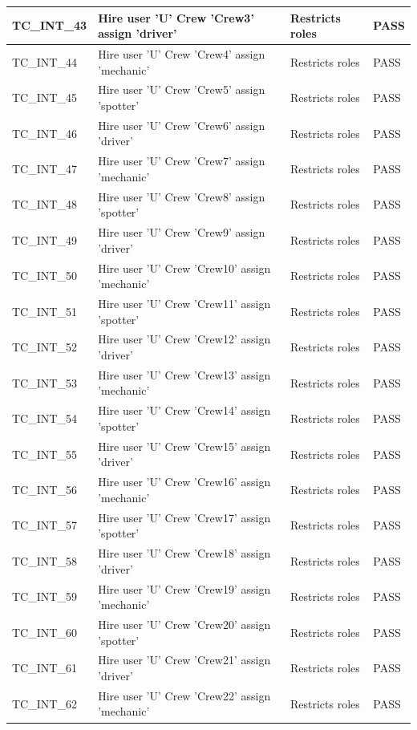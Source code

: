 \documentclass{article}
\begin{document}
\begin{longtable}{|p{2cm}|p{8cm}|p{3cm}|p{2cm}|}
\hline
TC\_INT\_43 & Hire user 'U' Crew 'Crew3' assign 'driver' & Restricts roles & PASS \\
\hline
TC\_INT\_44 & Hire user 'U' Crew 'Crew4' assign 'mechanic' & Restricts roles & PASS \\
\hline
TC\_INT\_45 & Hire user 'U' Crew 'Crew5' assign 'spotter' & Restricts roles & PASS \\
\hline
TC\_INT\_46 & Hire user 'U' Crew 'Crew6' assign 'driver' & Restricts roles & PASS \\
\hline
TC\_INT\_47 & Hire user 'U' Crew 'Crew7' assign 'mechanic' & Restricts roles & PASS \\
\hline
TC\_INT\_48 & Hire user 'U' Crew 'Crew8' assign 'spotter' & Restricts roles & PASS \\
\hline
TC\_INT\_49 & Hire user 'U' Crew 'Crew9' assign 'driver' & Restricts roles & PASS \\
\hline
TC\_INT\_50 & Hire user 'U' Crew 'Crew10' assign 'mechanic' & Restricts roles & PASS \\
\hline
TC\_INT\_51 & Hire user 'U' Crew 'Crew11' assign 'spotter' & Restricts roles & PASS \\
\hline
TC\_INT\_52 & Hire user 'U' Crew 'Crew12' assign 'driver' & Restricts roles & PASS \\
\hline
TC\_INT\_53 & Hire user 'U' Crew 'Crew13' assign 'mechanic' & Restricts roles & PASS \\
\hline
TC\_INT\_54 & Hire user 'U' Crew 'Crew14' assign 'spotter' & Restricts roles & PASS \\
\hline
TC\_INT\_55 & Hire user 'U' Crew 'Crew15' assign 'driver' & Restricts roles & PASS \\
\hline
TC\_INT\_56 & Hire user 'U' Crew 'Crew16' assign 'mechanic' & Restricts roles & PASS \\
\hline
TC\_INT\_57 & Hire user 'U' Crew 'Crew17' assign 'spotter' & Restricts roles & PASS \\
\hline
TC\_INT\_58 & Hire user 'U' Crew 'Crew18' assign 'driver' & Restricts roles & PASS \\
\hline
TC\_INT\_59 & Hire user 'U' Crew 'Crew19' assign 'mechanic' & Restricts roles & PASS \\
\hline
TC\_INT\_60 & Hire user 'U' Crew 'Crew20' assign 'spotter' & Restricts roles & PASS \\
\hline
TC\_INT\_61 & Hire user 'U' Crew 'Crew21' assign 'driver' & Restricts roles & PASS \\
\hline
TC\_INT\_62 & Hire user 'U' Crew 'Crew22' assign 'mechanic' & Restricts roles & PASS \\

\end{longtable}
\end{document}
